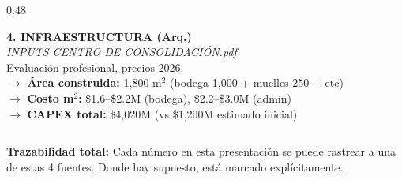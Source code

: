 \documentclass[aspectratio=169, 10pt]{beamer}
\begin{document}
\begin{frame}
\begin{columns}[T]
\begin{column}{0.48\textwidth}
\vspace{6pt}
\colorbox{verdeclaro}{\parbox{\dimexpr\linewidth-8pt}{\tiny\strut
\textcolor{cian}{\textbf{4. INFRAESTRUCTURA (Arq.)}}\\[2pt]
{\scriptsize\textit{INPUTS CENTRO DE CONSOLIDACI\'ON.pdf}}\\
Evaluaci\'on profesional, precios 2026.\\[3pt]
$\rightarrow$ \textbf{\'Area construida:} 1,800 m$^2$ (bodega 1,000 + muelles 250 + etc)\\
$\rightarrow$ \textbf{Costo m$^2$:} \$1.6--\$2.2M (bodega), \$2.2--\$3.0M (admin)\\
$\rightarrow$ \textbf{CAPEX total:} \$4,020M (vs \$1,200M estimado inicial)
\strut}}

\end{column}
\end{columns}

\vspace{4pt}
\colorbox{azulclaro}{\parbox{\dimexpr\textwidth-12pt}{\tiny\strut
\textcolor{azul}{\textbf{Trazabilidad total:}} Cada n\'umero en esta presentaci\'on se puede rastrear a una de estas 4 fuentes.
Donde hay supuesto, est\'a marcado expl\'icitamente.\strut}}
\end{frame}
\end{document}
